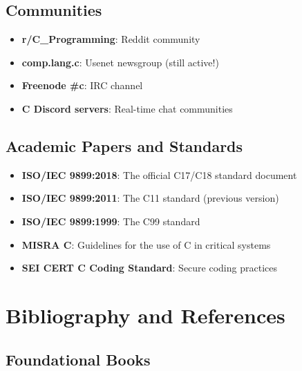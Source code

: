 \documentclass[10pt,openany]{book}
\begin{document}
\section*{Communities}

\begin{itemize}
    \item \textbf{r/C\_Programming}: Reddit community
    \item \textbf{comp.lang.c}: Usenet newsgroup (still active!)
    \item \textbf{Freenode \#c}: IRC channel
    \item \textbf{C Discord servers}: Real-time chat communities
\end{itemize}

\section*{Academic Papers and Standards}

\begin{itemize}
    \item \textbf{ISO/IEC 9899:2018}: The official C17/C18 standard document
    \item \textbf{ISO/IEC 9899:2011}: The C11 standard (previous version)
    \item \textbf{ISO/IEC 9899:1999}: The C99 standard
    \item \textbf{MISRA C}: Guidelines for the use of C in critical systems
    \item \textbf{SEI CERT C Coding Standard}: Secure coding practices
\end{itemize}

\chapter{Bibliography and References}

\section*{Foundational Books}
\end{document}
